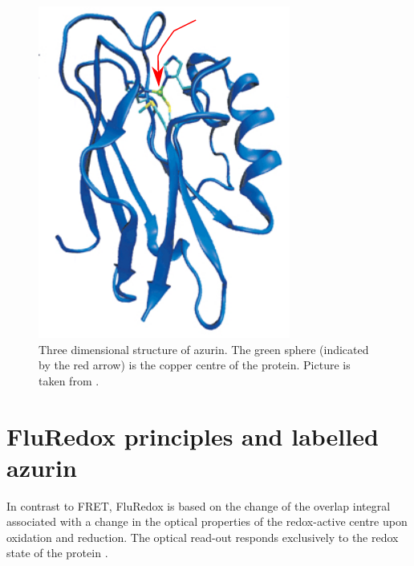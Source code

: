 \documentclass[twoside,single]{lion-msc}
\begin{document}
\begin{figure}[ht!]
\centering
\includegraphics[width=0.25 \textwidth]{azurin1_test}
\caption{Three dimensional structure of azurin. The green sphere (indicated by the red arrow) is the copper centre of the protein. Picture is taken from \cite{BORMAN2010}.} 
\label{azurin}
\end{figure}


\section{FluRedox principles and labelled azurin}
In contrast to FRET, FluRedox is based on the change of the overlap integral associated with a change in the optical properties of the redox-active centre upon oxidation and reduction. The optical read-out responds exclusively to the redox state of the protein \cite{Akklc}. 
\end{document}

